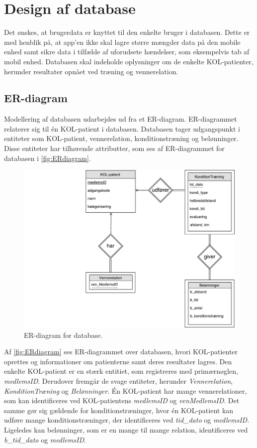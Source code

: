 \newpage
\section{Design af database} \label{sec:ER}
Det ønskes, at brugerdata er knyttet til den enkelte bruger i databasen. Dette er med henblik på, at app'en ikke skal lagre større mængder data på den mobile enhed samt sikre data i tilfælde af uforudsete hændelser, som eksempelvis tab af mobil enhed. Databasen skal indeholde oplysninger om de enkelte KOL-patienter, herunder resultater opnået ved træning og vennerelation. 

\subsection{ER-diagram}
Modellering af databasen udarbejdes ud fra et ER-diagram. ER-diagrammet relaterer sig til én KOL-patient i databasen. Databasen tager udgangspunkt i entiteter som KOL-patient, vennerelation, konditionstræning og belønninger. Disse entiteter har tilhørende attributter, som ses af ER-diagrammet for databasen i \autoref{fig:ERdiagram}.

\begin{figure} [H]
\centering
\includegraphics[width=1\textwidth]{figures/Aktivitetsdiagram/ERdiagram}
\caption{ER-diagram for database.}
\label{fig:ERdiagram}
\end{figure} 

\noindent
Af \autoref{fig:ERdiagram} ses ER-diagrammet over databasen, hvori KOL-patienter oprettes og informationer om patienterne samt deres resultater lagres. Den enkelte KOL-patient er en stærk entitiet, som registreres med primærnøglen, \textit{medlemsID}. Derudover fremgår de svage entiteter, herunder \textit{Vennerelation}, \textit{KonditionTræning} og \textit{Belønninger}. Én KOL-patient har mange vennerelationer, som kan identificeres ved KOL-patientens \textit{medlemsID} og \textit{venMedlemsID}. Det samme gør sig gældende for konditionstræninger, hvor én KOL-patient kan udføre mange konditionstræninger, der identificeres ved  \textit{tid\_dato} og \textit{medlemsID}. Ligeledes kan belønninger, som er en mange til mange relation, identificeres ved \textit{b\_tid\_dato} og \textit{medlemsID}.

